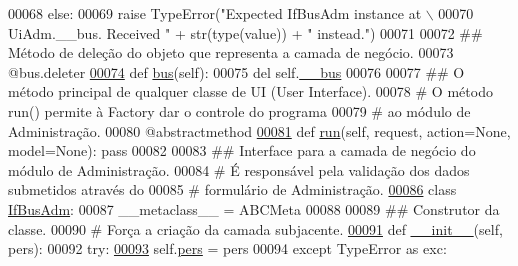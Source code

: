 \begin{DoxyCode}
00068         \textcolor{keywordflow}{else}:
00069             \textcolor{keywordflow}{raise} TypeError(\textcolor{stringliteral}{"Expected IfBusAdm instance at \(\backslash\)}
00070 \textcolor{stringliteral}{                UiAdm.\_\_bus. Received "} + str(type(value)) + \textcolor{stringliteral}{" instead."})
00071 
00072     \textcolor{comment}{## Método de deleção do objeto que representa a camada de negócio.}
00073     @bus.deleter
\hypertarget{AdmUnit_8py_source_l00074}{}\hyperlink{classAdm_1_1AdmUnit_1_1IfUiAdm_a6846282d9a13a62cfe54639b6ee121f8}{00074}     \textcolor{keyword}{def }\hyperlink{classAdm_1_1AdmUnit_1_1IfUiAdm_a604bb1c41014e85eee44db64a79a7fcc}{bus}(self):
00075         del self.\hyperlink{classAdm_1_1AdmUnit_1_1IfUiAdm_adf49041050fd2ce5fef85b0698f331e5}{\_\_bus}
00076 
00077     \textcolor{comment}{## O método principal de qualquer classe de UI (User Interface).}
00078     \textcolor{comment}{#   O método run() permite à Factory dar o controle do programa }
00079     \textcolor{comment}{#   ao módulo de Administração.}
00080     @abstractmethod
\hypertarget{AdmUnit_8py_source_l00081}{}\hyperlink{classAdm_1_1AdmUnit_1_1IfUiAdm_ad2879ed80544aa2a153c7eeed3a09a52}{00081}     \textcolor{keyword}{def }\hyperlink{classAdm_1_1AdmUnit_1_1IfUiAdm_ad2879ed80544aa2a153c7eeed3a09a52}{run}(self, request, action=None, model=None): \textcolor{keyword}{pass}
00082 
00083 \textcolor{comment}{## Interface para a camada de negócio do módulo de Administração.}
00084 \textcolor{comment}{#   É responsável pela validação dos dados submetidos através do }
00085 \textcolor{comment}{#   formulário de Administração.}
\hypertarget{AdmUnit_8py_source_l00086}{}\hyperlink{classAdm_1_1AdmUnit_1_1IfBusAdm}{00086} \textcolor{keyword}{class }\hyperlink{classAdm_1_1AdmUnit_1_1IfBusAdm}{IfBusAdm}:
00087     \_\_metaclass\_\_ = ABCMeta
00088 
00089     \textcolor{comment}{## Construtor da classe.}
00090     \textcolor{comment}{#   Força a criação da camada subjacente.}
\hypertarget{AdmUnit_8py_source_l00091}{}\hyperlink{classAdm_1_1AdmUnit_1_1IfBusAdm_a9d8de1bb17559a720c87dcbf7bafa5bd}{00091}     \textcolor{keyword}{def }\hyperlink{classAdm_1_1AdmUnit_1_1IfBusAdm_a9d8de1bb17559a720c87dcbf7bafa5bd}{\_\_init\_\_}(self, pers):
00092         \textcolor{keywordflow}{try}:
\hypertarget{AdmUnit_8py_source_l00093}{}\hyperlink{classAdm_1_1AdmUnit_1_1IfBusAdm_a95ea8f39fbbcddf44822e1614c712bfe}{00093}             self.\hyperlink{classAdm_1_1AdmUnit_1_1IfBusAdm_a95ea8f39fbbcddf44822e1614c712bfe}{pers} = pers
00094         \textcolor{keywordflow}{except} TypeError \textcolor{keyword}{as} exc:

\end{DoxyCode}
